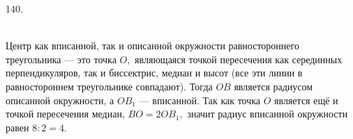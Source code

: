 140. \begin{figure}[ht!]
\end{figure}\\
Центр как вписанной, так и описанной окружности равностороннего треугольника --- это точка $O,$ являющаяся точкой пересечения как серединных перпендикуляров, так и биссектрис, медиан и высот (все эти линии в равностороннем треугольнике совпадают). Тогда $OB$ является радиусом описанной окружности, а $OB_1$ --- вписанной. Так как точка $O$ является ещё и точкой пересечения медиан, $BO=2OB_1,$ значит радиус вписанной окружности равен $8:2=4.$\newpage\noindent
